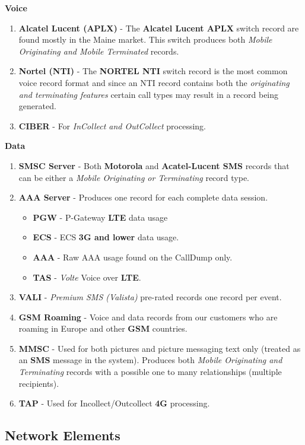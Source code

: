 \documentclass[12pt,twoside]{article}
\begin{document}
\textbf{Voice}
\begin{enumerate}
\item \textbf{Alcatel Lucent (APLX)} - The \textbf{Alcatel Lucent APLX} switch record
are found mostly in the Maine market. This switch produces both
\emph{Mobile Originating and Mobile Terminated} records.
\item \textbf{Nortel (NTI)} - The \textbf{NORTEL NTI} switch record is the most common
voice record format and since an NTI record contains both the
\emph{originating and terminating features} certain call types may
result in a record being generated.
\item \textbf{CIBER} - For \emph{InCollect and OutCollect} processing.\\
\end{enumerate}

\textbf{Data}
\begin{enumerate}
\item \textbf{SMSC Server} - Both \textbf{Motorola} and \textbf{Acatel-Lucent SMS} records
that can be either a \emph{Mobile Originating or Terminating} record
type.
\item \textbf{AAA Server} - Produces one record for each complete data session.
\begin{itemize}
\item \textbf{PGW} - P-Gateway \textbf{LTE} data usage
\item \textbf{ECS} - ECS \textbf{3G and lower} data usage.
\item \textbf{AAA} - Raw AAA usage found on the CallDump only.
\item \textbf{TAS} - \emph{Volte} Voice over \textbf{LTE}.
\end{itemize}
\item \textbf{VALI} - \emph{Premium SMS (Valista)} pre-rated records one record per
event.
\item \textbf{GSM Roaming} - Voice and data records from our customers who are
roaming in Europe and other \textbf{GSM} countries.
\item \textbf{MMSC} - Used for both pictures and picture messaging text only
(treated as an \textbf{SMS} message in the system). Produces both \emph{Mobile
Originating and Terminating} records with a possible one to many
relationships (multiple recipients).
\item \textbf{TAP} - Used for Incollect/Outcollect \textbf{4G} processing.
\end{enumerate}
\newpage
\subsection{Network Elements}
\label{sec:orgheadline21}
\footnotesize
\end{document}
